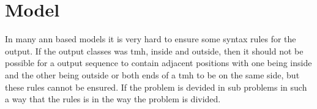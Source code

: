 \section{Model}





		
		
	

In many \gls{ann} based models it is very hard to ensure some syntax rules for the output. If the output 
classes was \gls{tmh}, inside and outside, then it should not be possible for a output sequence to contain 
adjacent positions with one being inside and the other being outside or both ends of a \gls{tmh} to be on the 
same side, but these rules cannot be ensured. If the problem is devided in sub problems in such a way that 
the rules is in the way the problem is divided. 

